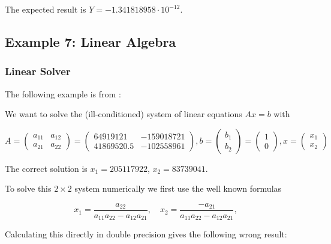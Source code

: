 The expected result is $Y = -1.341818958 \cdot 10^{-12}$.





\subsection{Example 7: Linear Algebra}

\subsubsection{Linear Solver}
The following example is from \cite{Hofschuster2004}:

We want to solve the (ill-conditioned) system of linear equations $Ax = b$ with

\begin{equation}
A = \begin{pmatrix}
a_{11} & a_{12} \\
a_{21} & a_{22} 
\end{pmatrix}  = \begin{pmatrix}
64919121 & -159018721 \\
41869520.5 & -102558961 
\end{pmatrix}, b = \begin{pmatrix}
b_{1} \\
b_{2} 
\end{pmatrix}
= \begin{pmatrix}
1 \\
0
\end{pmatrix} , x = \begin{pmatrix}
x_{1} \\
x_{2} 
\end{pmatrix}
\end{equation}

The correct solution is $x_1 = 205117922$, $x_2 = 83739041$.

To solve this $2 \times 2$ system numerically we first use the well known formulas

\begin{equation}
x_1 = \frac{a_{22}}{a_{11}a_{22} - a_{12}a_{21}}, \quad x_2 = \frac{-a_{21}}{a_{11}a_{22} - a_{12}a_{21}},
\end{equation}

Calculating this directly in double precision gives the following wrong result:  

